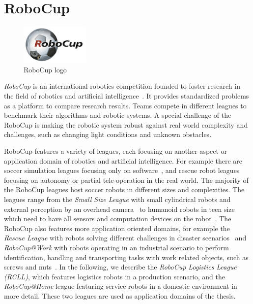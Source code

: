 \section{RoboCup}
\label{sec:robocup}
\begin{figure}
  \centering
  \vspace{-2.7ex}
  \includegraphics[width=0.3\textwidth]{img/robocup-logo}
  \vspace{-4ex}
  \caption[RoboCup logo]{RoboCup logo}
  \label{fig:robocup}
  \vspace{-2mm}
\end{figure}
\emph{RoboCup} is an international robotics competition founded to
foster research in the field of robotics and artificial
intelligence~\cite{RoboCup-Paper,Gazsim-Thesis}. It provides
standardized problems as a platform to compare research results. Teams
compete in different leagues to benchmark their algorithms and robotic
systems. A special challenge of the RoboCup is making the robotic
system robust against real world complexity and challenges, such as
changing light conditions and unknown obstacles.

RoboCup features a variety of leagues, each focusing on another aspect
or application domain of robotics and artificial intelligence.  For
example there are soccer simulation leagues focusing only on
software~\cite{simspark_old}, and rescue robot leagues focusing on autonomy or partial
tele-operation in the real world. The majority of the RoboCup leagues host soccer robots
in different sizes and complexities. The leagues range from the
\emph{Small Size League} with small cylindrical robots and external
perception by an overhead camera~\cite{rc-ssl} to humanoid
robots in teen size which need to have all sensors and computation
devices on the robot~\cite{rc-book}. The RoboCup also features more
application oriented domains, for example the \emph{Rescue League} with
robots solving different challenges in disaster
scenarios~\cite{rc-rescue} and \emph{RoboCup@Work} with robots
operating in an industrial scenario to perform identification,
handling and transporting tasks with work related objects, such as
screws and nuts~\cite{rc-work}. In the following, we describe the
\emph{RoboCup Logistics League (RCLL)}, which features logistics
robots in a production scenario, and the \emph{RoboCup@Home} league
featuring service robots in a domestic environment in more
detail. These two leagues are used as application domains of the
thesis.

